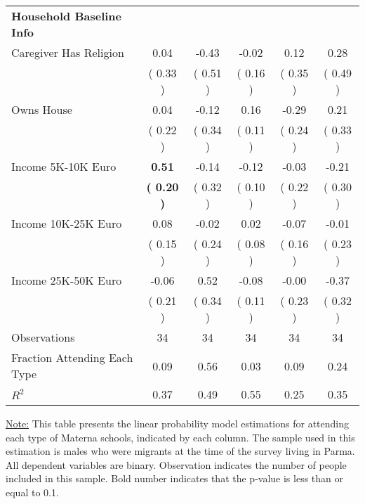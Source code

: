 \begin{table}[H]
{\begin{tabular}{lccccc}
\midrule
\textbf{Household Baseline Info} \\
\quad Caregiver Has Religion &      0.04 &     -0.43 &     -0.02 &      0.12 &      0.28 \\
\quad  & (     0.33 ) & (     0.51 )  & (     0.16 )  & (     0.35 ) & (     0.49 ) \\
\quad Owns House &      0.04 &     -0.12 &      0.16 &     -0.29 &      0.21 \\
\quad  & (     0.22 ) & (     0.34 )  & (     0.11 )  & (     0.24 ) & (     0.33 ) \\
\quad Income 5K-10K Euro & \textbf{     0.51} &     -0.14 &     -0.12 &     -0.03 &     -0.21 \\
\quad  & \textbf{(     0.20 )} & (     0.32 )  & (     0.10 )  & (     0.22 ) & (     0.30 ) \\
\quad Income 10K-25K Euro &      0.08 &     -0.02 &      0.02 &     -0.07 &     -0.01 \\
\quad  & (     0.15 ) & (     0.24 )  & (     0.08 )  & (     0.16 ) & (     0.23 ) \\
\quad Income 25K-50K Euro &     -0.06 &      0.52 &     -0.08 &     -0.00 &     -0.37 \\
\quad  & (     0.21 ) & (     0.34 )  & (     0.11 )  & (     0.23 ) & (     0.32 ) \\
\midrule
Observations & 34 & 34 & 34 & 34 & 34 \\
Fraction Attending Each Type &      0.09 &      0.56 &      0.03 &      0.09 &      0.24 \\
\midrule
$ R^2$ &      0.37 &      0.49 &      0.55 &      0.25 &      0.35 \\
\bottomrule
\end{tabular}}
\end{table}
\begin{footnotesize}
\noindent\underline{Note:} This table presents the linear probability model estimations for attending each type of Materna schools, indicated by each column. The sample used in this estimation is males who were migrants at the time of the survey living in Parma. All dependent variables are binary. Observation indicates the number of people included in this sample. Bold number indicates that the p-value is less than or equal to 0.1.
\end{footnotesize}
